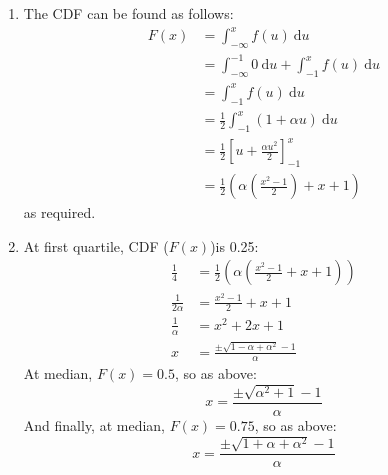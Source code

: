 \documentclass{article}
\theoremstyle{definition}
\theoremstyle{remark}
\theoremstyle{example}
\renewcommand{\d}{\ \mathrm{d}}
\begin{document}
\begin{enumerate}
\begin{enumerate}
\begin{proof}
\begin{align*}
					& = \frac{1}{2} \cdot 2\\
					& = 1
				\end{align*}
			as required.
			\end{proof}
			$\therefore$ we have that $f$ is a probability density function.
			\item The CDF can be found as follows:
			\begin{align*}
				F(x)&=\int_{-\infty}^{x}f(u) \d u\\
				&=\int_{-\infty}^{-1}0 \d u + \int_{-1}^{x}f(u) \d u\\
				& = \int_{-1}^{x}f(u) \d u\\
				& = \frac{1}{2} \int_{-1}^{x} \left(1 + \alpha u\right) \d u\\
				& = \frac{1}{2} \left[ u + \frac{\alpha u^2}{2} \right]^x_{-1}\\
				& = \frac{1}{2} \left(\alpha\left(\frac{x^2 - 1}{2}\right) + x + 1\right)
			\end{align*}
			as required.
			\item At first quartile, CDF ($F(x)$)is 0.25:
			\begin{align*}
				\frac{1}{4}&=\frac{1}{2}\left(\alpha\left(\frac{x^2-1}{2} + x + 1\right)\right)\\
				\frac{1}{2 \alpha} &= \frac{x^2-1}{2} + x + 1\\
				\frac{1}{\alpha} &= x^2 + 2x + 1\\
				x &= \frac{\pm \sqrt{1 - \alpha + \alpha^2} -1}{\alpha}
			\end{align*}
			At median, $F(x)=0.5$, so as above:
			\[
				x = \frac{\pm\sqrt{\alpha^2+1} -1}{\alpha}
			\]
			And finally, at median, $F(x)=0.75$, so as above:
			\[
				x=\frac{\pm \sqrt{1 + \alpha + \alpha^2} -1 }{\alpha}
			\]
		\end{enumerate}
	\end{enumerate}
\end{document}
